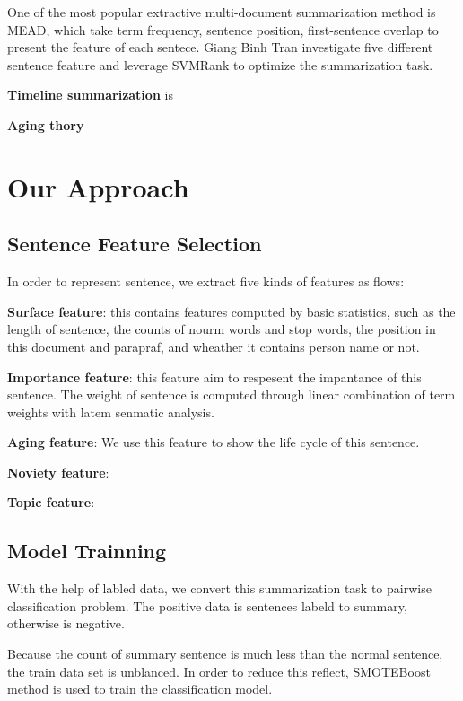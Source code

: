 \documentclass{llncs}
\begin{document}
One of the most popular extractive multi-document summarization method is MEAD, which take term frequency, sentence position, first-sentence overlap to present the feature of each sentece. Giang Binh Tran\cite{tran2013leveraging} investigate five different sentence feature and leverage SVMRank to optimize the summarization task. 

\textbf{Timeline summarization} is 

\textbf{Aging thory}




%
\section{Our Approach}
%

\subsection{Sentence Feature Selection}

In order to represent sentence, we extract five kinds of features as flows:

\textbf{Surface feature}: this contains features computed by basic statistics, such as the length of sentence, the counts of nourm words and stop words, the position in this document and parapraf, and wheather it contains person name or not.

\textbf{Importance feature}: this feature aim to respesent the impantance of this sentence. The weight of sentence is computed through linear combination of term weights with latem senmatic analysis.

\textbf{Aging feature}: We use this feature to show the life cycle of this sentence.

\textbf{Noviety feature}: 

\textbf{Topic feature}: 


\subsection{Model Trainning}

With the help of labled data, we convert this summarization task to pairwise classification problem. The positive data is sentences labeld to summary, otherwise is negative. 

Because the count of summary sentence is much less than the normal sentence, the train data set is unblanced. In order to reduce this reflect, SMOTEBoost method is used to train the classification model.
\end{document}
